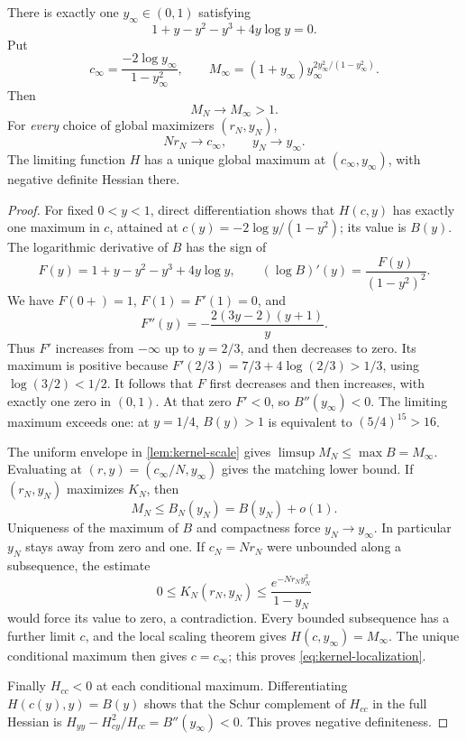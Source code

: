 \begin{theorem}
\label{thm:kernel-global-limit}
There is exactly one $y_\infty\in(0,1)$ satisfying
\begin{equation}\label{eq:yinfty}
 1+y-y^2-y^3+4y\log y=0.
\end{equation}
Put
\begin{equation}\label{eq:cinfty}
 c_\infty=\frac{-2\log y_\infty}{1-y_\infty^2},\qquad
 M_\infty=(1+y_\infty)
      y_\infty^{2y_\infty^2/(1-y_\infty^2)}.
\end{equation}
Then
\begin{equation}\label{eq:Mnlimit}
 M_N\longrightarrow M_\infty>1.
\end{equation}
For \emph{every} choice of global maximizers $(r_N,y_N)$,
\begin{equation}\label{eq:kernel-localization}
 Nr_N\longrightarrow c_\infty,\qquad y_N\longrightarrow y_\infty.
\end{equation}
The limiting function $H$ has a unique global maximum at
$(c_\infty,y_\infty)$, with negative definite Hessian there.
\end{theorem}
\begin{proof}
For fixed $0<y<1$, direct differentiation shows that $H(c,y)$ has
exactly one maximum in $c$, attained at
$c(y)=-2\log y/(1-y^2)$; its value is $B(y)$.
The logarithmic derivative of $B$ has the sign of
\[
 F(y)=1+y-y^2-y^3+4y\log y,
 \qquad
 (\log B)'(y)=\frac{F(y)}{(1-y^2)^2}.
\]
We have $F(0+)=1$, $F(1)=F'(1)=0$, and
\[
 F''(y)=-\frac{2(3y-2)(y+1)}y.
\]
Thus $F'$ increases from $-\infty$ up to $y=2/3$, and then decreases
to zero. Its maximum is positive because
$F'(2/3)=7/3+4\log(2/3)>1/3$, using $\log(3/2)<1/2$.
It follows that $F$ first decreases and then increases, with exactly
one zero in $(0,1)$. At that zero $F'<0$, so $B''(y_\infty)<0$.
The limiting maximum exceeds one: at $y=1/4$,
$B(y)>1$ is equivalent to $(5/4)^{15}>16$.

The uniform envelope in \cref{lem:kernel-scale} gives
$\limsup M_N\le\max B=M_\infty$. Evaluating at
$(r,y)=(c_\infty/N,y_\infty)$ gives the matching lower bound.
If $(r_N,y_N)$ maximizes $K_N$, then
\[
 M_N\le B_N(y_N)=B(y_N)+o(1).
\]
Uniqueness of the maximum of $B$ and compactness force $y_N\to y_\infty$.
In particular $y_N$ stays away from zero and one. If $c_N=Nr_N$
were unbounded along a subsequence, the estimate
\[
 0\le K_N(r_N,y_N)
 \le\frac{e^{-Nr_Ny_N^2}}{1-y_N}
\]
would force its value to zero, a contradiction. Every bounded
subsequence has a further limit $c$, and the local scaling theorem
gives $H(c,y_\infty)=M_\infty$. The unique conditional maximum
then gives $c=c_\infty$; this proves \eqref{eq:kernel-localization}.

Finally $H_{cc}<0$ at each conditional maximum. Differentiating
$H(c(y),y)=B(y)$ shows that the Schur complement of $H_{cc}$ in
the full Hessian is
$H_{yy}-H_{cy}^2/H_{cc}=B''(y_\infty)<0$.
This proves negative definiteness.
\end{proof}


